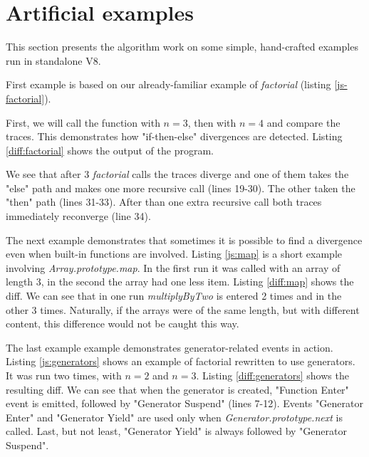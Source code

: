 \section{Artificial examples}

This section presents the algorithm work on some simple, hand-crafted examples run in standalone V8.

First example is based on our already-familiar example of \emph{factorial} (listing \ref{js-factorial}).

First, we will call the function with $n=3$, then with $n=4$ and compare the traces.
This demonstrates how "if-then-else" divergences are detected.
Listing \ref{diff:factorial} shows the output of the program.

We see that after 3 \emph{factorial} calls the traces diverge and one of them takes the "else"
path and makes one more recursive call (lines 19-30). The other taken the "then" path (lines 31-33).
After than one extra recursive call both traces immediately reconverge (line 34).



The next example demonstrates that sometimes it is possible to find a divergence even when
built-in functions are involved. Listing \ref{js:map} is a short example involving \emph{Array.prototype.map}.
In the first run it was called with an array of length 3, in the second the array had one less item.
Listing \ref{diff:map} shows the diff. We can see that in one run \emph{multiplyByTwo} is entered 2 times and in the
other 3 times. Naturally, if the arrays were of the same length, but with different content, this difference would not
be caught this way.




						
The last example example demonstrates generator-related events in action.
Listing \ref{js:generators} shows an example of factorial rewritten to use generators. It was run two times, with $n=2$ and $n=3$.
Listing \ref{diff:generators} shows the resulting diff. We can see that when the generator is created, "Function Enter" event
is emitted, followed by "Generator Suspend" (lines 7-12). Events "Generator Enter" and "Generator Yield" are used 
only when \emph{Generator.prototype.next} is called. Last, but not least, "Generator Yield" is always followed by "Generator Suspend".

